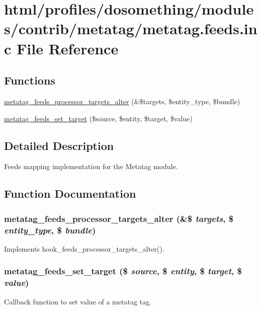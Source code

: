 \hypertarget{metatag_8feeds_8inc}{
\section{html/profiles/dosomething/modules/contrib/metatag/metatag.feeds.inc File Reference}
\label{metatag_8feeds_8inc}
}
\subsection*{Functions}
\begin{DoxyCompactItemize}
\item 
\hyperlink{metatag_8feeds_8inc_adb1ebcc9c582a8af48df9969034043fb}{metatag\_\-feeds\_\-processor\_\-targets\_\-alter} (\&\$targets, \$entity\_\-type, \$bundle)
\item 
\hyperlink{metatag_8feeds_8inc_a354c52597d0bcafc7f96f989458c83a3}{metatag\_\-feeds\_\-set\_\-target} (\$source, \$entity, \$target, \$value)
\end{DoxyCompactItemize}


\subsection{Detailed Description}
Feeds mapping implementation for the Metatag module. 

\subsection{Function Documentation}
\hypertarget{metatag_8feeds_8inc_adb1ebcc9c582a8af48df9969034043fb}{
\subsubsection[{metatag\_\-feeds\_\-processor\_\-targets\_\-alter}]{\setlength{\rightskip}{0pt plus 5cm}metatag\_\-feeds\_\-processor\_\-targets\_\-alter (\&\$ {\em targets}, \/  \$ {\em entity\_\-type}, \/  \$ {\em bundle})}}
\label{metatag_8feeds_8inc_adb1ebcc9c582a8af48df9969034043fb}
Implements hook\_\-feeds\_\-processor\_\-targets\_\-alter(). \hypertarget{metatag_8feeds_8inc_a354c52597d0bcafc7f96f989458c83a3}{
\subsubsection[{metatag\_\-feeds\_\-set\_\-target}]{\setlength{\rightskip}{0pt plus 5cm}metatag\_\-feeds\_\-set\_\-target (\$ {\em source}, \/  \$ {\em entity}, \/  \$ {\em target}, \/  \$ {\em value})}}
\label{metatag_8feeds_8inc_a354c52597d0bcafc7f96f989458c83a3}
Callback function to set value of a metatag tag. 
